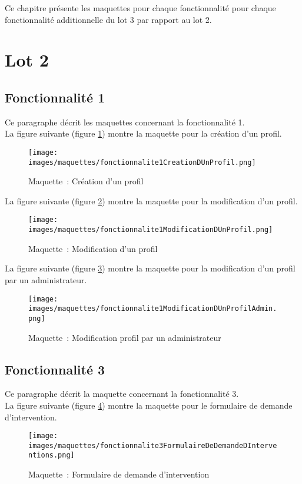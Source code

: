 Ce chapitre présente les maquettes pour chaque fonctionnalité pour chaque fonctionnalité additionnelle du lot 3 par rapport au lot 2.
\section{Lot 2}
\subsection{Fonctionnalité 1}
Ce paragraphe décrit les maquettes concernant la fonctionnalité 1. \\

La figure suivante (figure \ref{maquette1-1}) montre la maquette pour la création d'un profil.
\begin{figure}[H]
	\centering
	\texttt{[image: images/maquettes/fonctionnalite1CreationDUnProfil.png]}
	\caption{Maquette~: Création d'un profil }
	\label{maquette1-1}
\end{figure}

La figure suivante (figure \ref{maquette1-2}) montre la maquette pour la modification d'un profil.
\begin{figure}[H]
	\centering
	\texttt{[image: images/maquettes/fonctionnalite1ModificationDUnProfil.png]}
	\caption{Maquette~: Modification d'un profil}
	\label{maquette1-2}
\end{figure}

La figure suivante (figure \ref{maquette1-3}) montre la maquette pour la modification d'un profil par un administrateur.
\begin{figure}[H]
	\centering
	\texttt{[image: images/maquettes/fonctionnalite1ModificationDUnProfilAdmin.png]}
	\caption{Maquette~: Modification profil par un administrateur}
	\label{maquette1-3}
\end{figure}

\subsection{Fonctionnalité 3}
Ce paragraphe décrit la maquette concernant la fonctionnalité 3. \\

La figure suivante (figure \ref{maquette3-1}) montre la maquette pour le formulaire de demande d'intervention.
\begin{figure}[H]
	\centering
	\texttt{[image: images/maquettes/fonctionnalite3FormulaireDeDemandeDInterventions.png]}
	\caption{Maquette~: Formulaire de demande d'intervention}
	\label{maquette3-1}
\end{figure}

